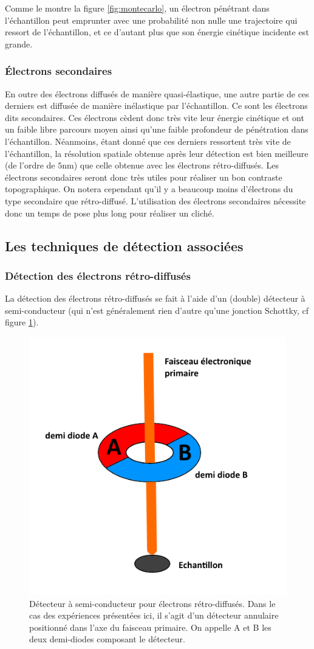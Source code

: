 \documentclass[a4paper,12pt]{article}
\begin{document}
Comme le montre la figure \ref{fig:montecarlo}, un électron pénétrant dans l'échantillon peut emprunter
 avec une probabilité non nulle une trajectoire qui
  ressort de l'échantillon, et ce d'autant plus que son énergie cinétique incidente est grande.

\subsubsection*{Électrons secondaires}
En outre des électrons diffusés de manière quasi-élastique, une autre partie de ces derniers est diffusée de manière inélastique par l'échantillon.
Ce sont les électrons dits secondaires. 
Ces électrons cèdent donc très vite leur énergie cinétique et ont un faible libre parcours moyen ainsi qu'une faible profondeur de pénétration dans l'échantillon. 
Néanmoins, étant donné que ces derniers ressortent très vite de l'échantillon, la résolution spatiale obtenue 
après leur détection est bien meilleure (de l'ordre de $5$nm) que celle obtenue avec les électrons rétro-diffusés.
Les électrons secondaires seront donc très utiles pour réaliser un bon contraste topographique.
On notera cependant qu'il y a beaucoup moins d'électrons du type secondaire que rétro-diffusé. 
L'utilisation des électrons secondaires nécessite donc un temps de pose plus long pour réaliser un cliché.

\subsection{Les techniques de détection associées}

\subsubsection*{Détection des électrons rétro-diffusés}

La détection des électrons rétro-diffusés se fait à l'aide d'un (double) détecteur à semi-conducteur 
(qui n'est généralement rien d'autre qu'une jonction Schottky, cf figure \ref{fig:detect_sc}). 

\begin{figure}[h]
\centering
\includegraphics[width = 0.5 \textwidth]{images/detect_sc.png}
\caption{Détecteur à semi-conducteur pour électrons rétro-diffusés. Dans le cas des expériences présentées ici, il s'agit d'un détecteur annulaire positionné dans l'axe du faisceau primaire. On appelle A et B les deux demi-diodes composant le détecteur.}
\label{fig:detect_sc}
\end{figure}
\end{document}
